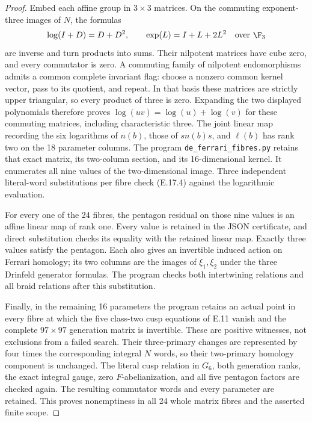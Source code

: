 \begin{proof}
Embed each affine group in $3\times3$ matrices.
On the commuting exponent-three images of $N$,
the formulas
\[
 \log(I+D)=D+D^2,\qquad
 \exp(L)=I+L+2L^2\quad\text{over }\F_3
\]
are inverse and turn products into sums. Their
nilpotent matrices have cube zero, and every
commutator is zero. A commuting family of nilpotent
endomorphisms admits a common complete invariant flag:
choose a nonzero common kernel vector, pass to its
quotient, and repeat. In that basis these matrices
are strictly upper triangular, so every product of
three is zero. Expanding the two displayed polynomials
therefore proves $\log(uv)=\log(u)+\log(v)$ for
these commuting matrices, including characteristic three.
The joint linear map
recording the six logarithms of $n(b)$, those of
$s n(b)s$, and $\ell(b)$ has rank two on the
18 parameter columns. The program
\texttt{de\_ferrari\_fibres.py} retains that exact
matrix, its two-column section, and its
16-dimensional kernel. It enumerates all nine
values of the two-dimensional image. Three
independent literal-word substitutions per fibre
check (E.17.4) against the logarithmic evaluation.

For every one of the 24 fibres, the pentagon
residual on those nine values is an affine
linear map of rank one. Every value is retained
in the JSON certificate, and direct substitution
checks its equality with the retained linear
map. Exactly three values satisfy the pentagon.
Each also gives an invertible induced action
on Ferrari homology; its two columns are the
images of $\xi_1,\xi_2$ under the three
Drinfeld generator formulas. The program checks
both intertwining relations and all braid
relations after this substitution.

Finally, in the remaining 16 parameters the
program retains an actual point in every fibre
at which the five class-two cusp equations of
E.11 vanish and the complete $97\times97$
generation matrix is invertible. These are
positive witnesses, not exclusions from a
failed search. Their three-primary changes
are represented by four times the corresponding
integral $N$ words, so their two-primary
homology component is unchanged. The literal
cusp relation in $G_6$, both generation ranks,
the exact integral gauge, zero $F$-abelianization,
and all five pentagon factors are checked again.
The resulting commutator words and every
parameter are retained. This proves nonemptiness
in all 24 whole matrix fibres and the asserted
finite scope.
\end{proof}

